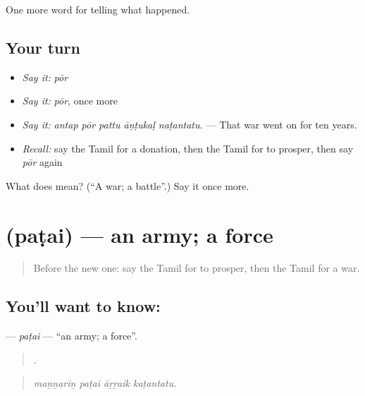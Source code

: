 \begin{grammarlens}[title={What you've built}]
One more word for telling what happened.
\end{grammarlens}

\subsection*{Your turn}
\begin{itemize}
\raggedright
  \item \emph{Say it:} \emph{pōr}
  \item \emph{Say it:} \emph{pōr}, once more
  \item \emph{Say it:} \emph{antap pōr pattu āṇṭukaḷ naṭantatu.} — That war went on for ten years.
  \item \emph{Recall:} say the Tamil for a donation, then the Tamil for to prosper, then say \emph{pōr} again
\end{itemize}

\begin{tcolorbox}[breakable,colback=teal!4,colframe=teal!35!black,title={Before you move on}]
What does  mean? (\textquotedblleft{}A war; a battle\textquotedblright{}.) Say it once more.
\end{tcolorbox}
\section[\texorpdfstring{\ta{படை} (paṭai)}{படை (paṭai)}]{ (paṭai) — an army; a force}

\label{lesson:TA-C332-patai}



\begin{quote}
Before the new one: say the Tamil for to prosper, then the Tamil for a war.
\end{quote}

\subsection*{You'll want to know: }
\textbf{} — \emph{paṭai} — \textquotedblleft{}an army; a force\textquotedblright{}.

\begin{quote}
   .
\end{quote}

\begin{quote}
\emph{maṉṉariṉ paṭai āṟṟaik kaṭantatu.}
\end{quote}


